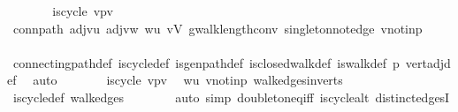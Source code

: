 \begin{isabellebody}
\ \ \ \ \isamarkupfalse%
\ \isamarkupfalse%
\ {\isachardoublequoteopen}is{\isacharunderscore}{\kern0pt}cycle\ {\isacharparenleft}{\kern0pt}v{\isacharhash}{\kern0pt}p{\isacharat}{\kern0pt}{\isacharbrackleft}{\kern0pt}v{\isacharbrackright}{\kern0pt}{\isacharparenright}{\kern0pt}{\isachardoublequoteclose}\ \isamarkupfalse%
\ conn{\isacharunderscore}{\kern0pt}path\ adj{\isacharunderscore}{\kern0pt}vu\ adj{\isacharunderscore}{\kern0pt}vw\ {\isacartoucheopen}w{\isasymnoteq}u{\isacartoucheclose}\ {\isacartoucheopen}v{\isasymin}V{\isacartoucheclose}\ g{\isacharprime}{\kern0pt}{\isachardot}{\kern0pt}walk{\isacharunderscore}{\kern0pt}length{\isacharunderscore}{\kern0pt}conv\ singleton{\isacharunderscore}{\kern0pt}not{\isacharunderscore}{\kern0pt}edge\ v{\isacharunderscore}{\kern0pt}notin{\isacharunderscore}{\kern0pt}p\isanewline
\ \ \ \ \ \ \isamarkupfalse%
\ connecting{\isacharunderscore}{\kern0pt}path{\isacharunderscore}{\kern0pt}def\ is{\isacharunderscore}{\kern0pt}cycle{\isacharunderscore}{\kern0pt}def\ is{\isacharunderscore}{\kern0pt}gen{\isacharunderscore}{\kern0pt}path{\isacharunderscore}{\kern0pt}def\ is{\isacharunderscore}{\kern0pt}closed{\isacharunderscore}{\kern0pt}walk{\isacharunderscore}{\kern0pt}def\ is{\isacharunderscore}{\kern0pt}walk{\isacharunderscore}{\kern0pt}def\ p\ vert{\isacharunderscore}{\kern0pt}adj{\isacharunderscore}{\kern0pt}def\ \isamarkupfalse%
\ auto\isanewline
\ \ \ \ \isamarkupfalse%
\ \isamarkupfalse%
\ {\isachardoublequoteopen}is{\isacharunderscore}{\kern0pt}cycle{}\ {\isacharparenleft}{\kern0pt}v{\isacharhash}{\kern0pt}p{\isacharat}{\kern0pt}{\isacharbrackleft}{\kern0pt}v{\isacharbrackright}{\kern0pt}{\isacharparenright}{\kern0pt}{\isachardoublequoteclose}\ \isamarkupfalse%
\ {\isacartoucheopen}w{\isasymnoteq}u{\isacartoucheclose}\ v{\isacharunderscore}{\kern0pt}notin{\isacharunderscore}{\kern0pt}p\ walk{\isacharunderscore}{\kern0pt}edges{\isacharunderscore}{\kern0pt}in{\isacharunderscore}{\kern0pt}verts\ \isamarkupfalse%
\ is{\isacharunderscore}{\kern0pt}cycle{}{\isacharunderscore}{\kern0pt}def\ walk{\isacharunderscore}{\kern0pt}edges\isanewline
\ \ \ \ \ \ \isamarkupfalse%
\ {\isacharparenleft}{\kern0pt}auto\ simp{\isacharcolon}{\kern0pt}\ doubleton{\isacharunderscore}{\kern0pt}eq{\isacharunderscore}{\kern0pt}iff\ is{\isacharunderscore}{\kern0pt}cycle{\isacharunderscore}{\kern0pt}alt\ distinct{\isacharunderscore}{\kern0pt}edgesI{\isacharparenright}{\kern0pt}\isanewline

\end{isabellebody}
